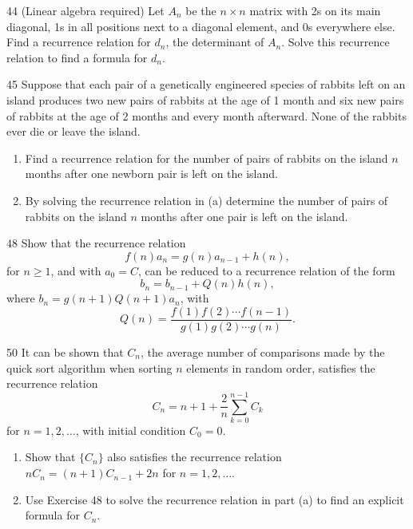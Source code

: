 \documentclass[11pt]{article}
\begin{document}
\begin{exercise}{44}
    (Linear algebra required) Let $A_n$ be the $n \times n$ matrix
    with 2s on its main diagonal, 1s in all positions next to a
    diagonal element, and 0s everywhere else. Find a recurrence
    relation for $d_n$, the determinant of $A_n$. Solve this
    recurrence relation to find a formula for $d_n$.
\end{exercise}

\begin{exercise}{45}
    Suppose that each pair of a genetically engineered species of
    rabbits left on an island produces two new pairs of rabbits at
    the age of 1 month and six new pairs of rabbits at the age of 2
    months and every month afterward. None of the rabbits ever die or
    leave the island.
    \begin{enumerate}[label=(\alph*)]
        \item Find a recurrence relation for the number of pairs of
        rabbits on the island $n$ months after one newborn pair is
        left on the island.
        \item By solving the recurrence relation in (a) determine the
        number of pairs of rabbits on the island $n$ months after one
        pair is left on the island.
    \end{enumerate}
\end{exercise}

\begin{exercise}{48}
    Show that the recurrence relation
    \[
    f(n) a_n = g(n) a_{n-1} + h(n),
    \]
    for $n \geq 1$, and with $a_0 = C$, can be reduced to a recurrence
    relation of the form
    \[
    b_n = b_{n-1} + Q(n) h(n),
    \]
    where $b_n = g(n+1) Q(n+1) a_n$, with
    \[
    Q(n) = \frac{f(1) f(2) \cdots f(n-1)}{g(1) g(2) \cdots g(n)}.
    \]
\end{exercise}

\begin{exercise}{50}
    It can be shown that $C_n$, the average number of comparisons
    made by the quick sort algorithm when sorting $n$ elements in
    random order, satisfies the recurrence relation
    \[
    C_n = n + 1 + \frac{2}{n} \sum_{k=0}^{n-1} C_k
    \]
    for $n = 1, 2, \dots$, with initial condition $C_0 = 0$.
    \begin{enumerate}[label=(\alph*)]
        \item Show that $\{C_n\}$ also satisfies the recurrence
        relation $nC_n = (n+1)C_{n-1} + 2n$ for $n = 1, 2, \dots$.
        \item Use Exercise 48 to solve the recurrence relation in
        part (a) to find an explicit formula for $C_n$.
    \end{enumerate}
\end{exercise}
\end{document}
